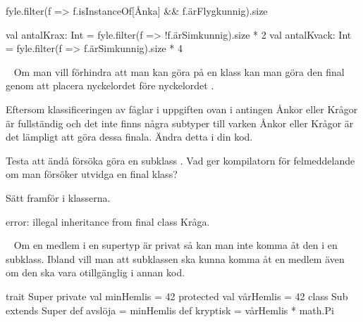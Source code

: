 \SOLUTION


\TaskSolved \what


\SubtaskSolved
\begin{Code}
fyle.filter(f => f.isInstanceOf[Ånka] && f.ärFlygkunnig).size
\end{Code}

\SubtaskSolved
\begin{Code}
val antalKrax: Int = fyle.filter(f => !f.ärSimkunnig).size * 2
val antalKvack: Int = fyle.filter(f => f.ärSimkunnig).size * 4
\end{Code}


\QUESTEND












\QUESTBEGIN

\Task  \what~  Om man vill förhindra att man kan göra  på en klass kan man göra den final genom att placera nyckelordet  före nyckelordet .

\Subtask Eftersom klassificeringen av fåglar i uppgiften ovan i antingen Ånkor eller Krågor är fullständig och det inte finns några subtyper till varken Ånkor eller Krågor är det lämpligt att göra dessa finala. Ändra detta i din kod.

\Subtask Testa att ändå försöka göra en subklass . Vad ger kompilatorn för felmeddelande om man försöker utvidga en final klass?


\SOLUTION


\TaskSolved \what


\SubtaskSolved  Sätt  framför  i klasserna.

\SubtaskSolved  error: illegal inheritance from final class Kråga.


\QUESTEND







\QUESTBEGIN

\Task  \what~  Om en medlem i en supertyp är privat så kan man inte komma åt den i en subklass. Ibland vill man att subklassen ska kunna komma åt en medlem även om den ska vara otillgänglig i annan kod.

\begin{REPL}
trait Super {
  private val minHemlis = 42
  protected val vårHemlis = 42
}
class Sub extends Super {
  def avslöja = minHemlis
  def kryptisk = vårHemlis * math.Pi
}
\end{REPL}

